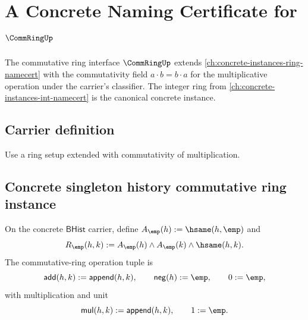 \chapter{A Concrete Naming Certificate for \(\CommRingUp\)}
\label{ch:concrete-instances-commring-namecert}

The commutative ring interface \(\CommRingUp\) extends \autoref{ch:concrete-instances-ring-namecert} with the commutativity field \(a \cdot b = b \cdot a\) for the multiplicative operation under the carrier's classifier. The integer ring from \autoref{ch:concrete-instances-int-namecert} is the canonical concrete instance.

\section{Carrier definition}

\begin{definition}
\label{def:commring-carrier}
Use a ring setup extended with commutativity of multiplication.
\end{definition}

\section{Concrete singleton history commutative ring instance}
\label{sec:commring-concrete-singleton-history-instance}

\begin{definition}
\label{def:concrete-singleton-history-commring-instance}
On the concrete $\mathsf{BHist}$ carrier, define
$A_{\emp}(h):=\hsame(h,\emp)$ and
$$
R_{\emp}(h,k):=A_{\emp}(h)\land A_{\emp}(k)\land\hsame(h,k).
$$
The commutative-ring operation tuple is
$$
\mathsf{add}(h,k):=\mathsf{append}(h,k),\qquad
\mathsf{neg}(h):=\emp,\qquad
0:=\emp,
$$
with multiplication and unit
$$
\mathsf{mul}(h,k):=\mathsf{append}(h,k),\qquad
1:=\emp.
$$
\end{definition}


